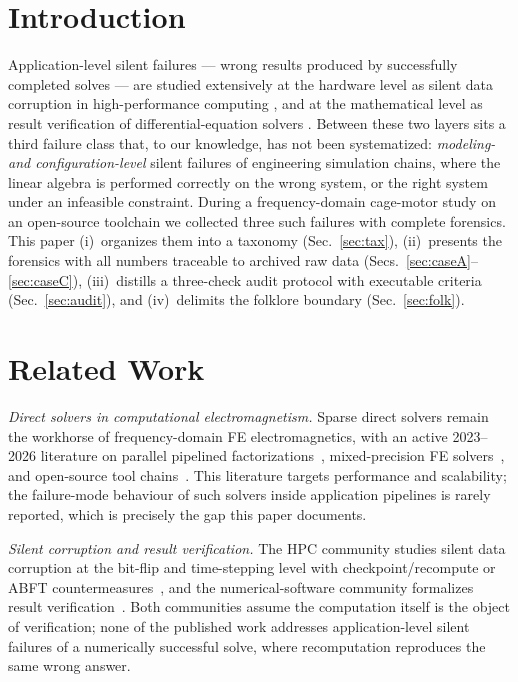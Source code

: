 \documentclass[preprint,12pt]{elsarticle}
\begin{document}
\section{Introduction}
Application-level silent failures --- wrong results produced by
successfully completed solves --- are studied extensively at the hardware
level as silent data corruption in high-performance computing
\cite{sdc2011,sdc2014}, and at the mathematical level as result
verification of differential-equation solvers \cite{ref14}. Between
these two layers sits a third failure class that, to our knowledge, has
not been systematized: \emph{modeling- and configuration-level} silent
failures of engineering simulation chains, where the linear algebra is
performed correctly on the wrong system, or the right system under an
infeasible constraint. During a frequency-domain cage-motor study on an
open-source toolchain we collected three such failures with complete
forensics. This paper (i)~organizes them into a taxonomy
(Sec.~\ref{sec:tax}), (ii)~presents the forensics with all numbers
traceable to archived raw data (Secs.~\ref{sec:caseA}--\ref{sec:caseC}),
(iii)~distills a three-check audit protocol with executable criteria
(Sec.~\ref{sec:audit}), and (iv)~delimits the folklore boundary
(Sec.~\ref{sec:folk}).

\section{Related Work}
\emph{Direct solvers in computational electromagnetism.} Sparse direct
solvers remain the workhorse of frequency-domain FE electromagnetics,
with an active 2023--2026 literature on parallel pipelined
factorizations~\cite{ref01}, mixed-precision FE
solvers~\cite{ref03}, and open-source tool
chains~\cite{ref07}. This literature targets performance and
scalability; the failure-mode behaviour of such solvers inside
application pipelines is rarely reported, which is precisely the gap
this paper documents.

\emph{Silent corruption and result verification.} The HPC community
studies silent data corruption at the bit-flip and time-stepping level
with checkpoint/recompute or ABFT countermeasures~\cite{ref12,ref13},
and the numerical-software community formalizes result
verification~\cite{ref14}. Both communities assume the computation
itself is the object of verification; none of the published work
addresses application-level silent failures of a numerically successful
solve, where recomputation reproduces the same wrong answer.
\end{document}
